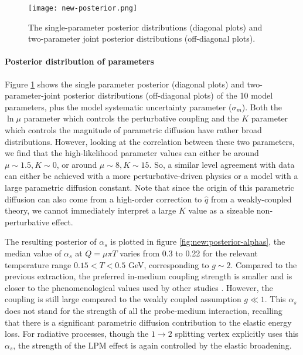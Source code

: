\begin{figure}
\singlespacing
\centering
\texttt{[image: new-posterior.png]}
\caption[The single-parameter posterior distributions (diagonal plots) and]{The single-parameter posterior distributions (diagonal plots) and two-parameter joint posterior distributions (off-diagonal plots).}
\label{fig:new:posterior}
\end{figure}

\paragraph{Posterior distribution of parameters} Figure \ref{fig:new:posterior} shows the single parameter posterior (diagonal plots) and two-parameter-joint posterior distributions (off-diagonal plots) of the 10 model parameters, plus the model systematic uncertainty parameter ($\sigma_m$).
Both the $\ln\mu$ parameter which controls the perturbative coupling and the $K$ parameter which controls the magnitude of parametric diffusion have rather broad distributions.
However, looking at the correlation between these two parameters, we find that the high-likelihood parameter values can either be around $\mu\sim 1.5, K\sim 0$, or around $\mu\sim 8, K\sim 15$.
So, a similar level agreement with data can either be achieved with a more perturbative-driven physics or a model with a large parametric diffusion constant.
Note that since the origin of this parametric diffusion can also come from a high-order correction to $\hat{q}$ from a weakly-coupled theory, we cannot immediately interpret a large $K$ value as a sizeable non-perturbative effect.

The resulting posterior of $\alpha_s$ is plotted in figure \ref{fig:new:posterior-alphas}, the median value of $\alpha_s$ at $Q=\mu\pi T$ varies from 0.3 to 0.22 for the relevant temperature range $0.15 < T < 0.5$ GeV, corresponding to $g\sim 2$.
Compared to the previous extraction, the preferred in-medium coupling strength is smaller and is closer to the phenomenological values used by other studies \cite{Burke:2013yra}.
However, the coupling is still large compared to the weakly coupled assumption $g\ll 1$.
This $\alpha_s$ does not stand for the strength of all the probe-medium interaction, recalling that there is a significant parametric diffusion contribution to the elastic energy loss.
For radiative processes, though the $1\rightarrow 2$ splitting vertex explicitly uses this $\alpha_s$, the strength of the LPM effect is again controlled by the elastic broadening.

